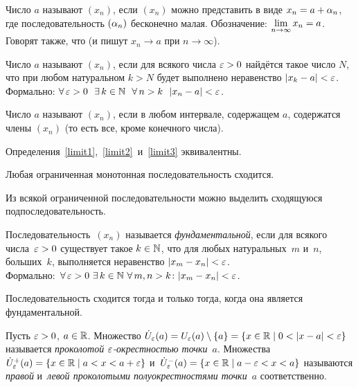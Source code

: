 \documentclass[a4paper,12pt]{article}
\newcommand{\sm}{\setminus}
\begin{document}

\renewcommand{\spacer}{\vspace{1mm}}

\label{limit1}
Число $a$ называют  $(x_n)$, если $(x_n)$ можно представить в виде $x_n = a + \alpha_n$, где последовательность $(\alpha_n)$ бесконечно малая.
Обозначение: $\lim\limits_{n \rightarrow \infty} x_n = a$.
Говорят также, что  (и пишут $x_n \to a$ при $n \to \infty$).

\label{limit2}
Число $a$ называют  $(x_n)$, если для всякого числа $\varepsilon > 0$ найдётся такое число $N$, что при любом натуральном $k > N$ будет выполнено неравенство $|x_k - a| < \varepsilon$.\\
Формально: $\forall\,\ep>0\ \ \exists\,k\in\N\ \ \forall\,n>k \ \ |x_n-a|<\ep$.

\label{limit3}
Число $a$ называют  $(x_n)$, если в любом интервале, содержащем $a$, содержатся  члены $(x_n)$ (то есть все, кроме конечного числа).

Определения~\ref{limit1},~\ref{limit2}~и~\ref{limit3} эквивалентны.

Любая ограниченная монотонная последовательность сходится.\hspace{-2mm}

Из всякой ограниченной последовательности можно выделить сходящуюся подпоследовательность.

Последовательность~$(x_n)$ называется \emph{фундаментальной}, если для всякого числа~$\varepsilon>0$ существует такое $k\in\mathbb{N}$, что для любых натуральных~$m$ и~$n$, больших~$k$, выполняется неравенство $|x_m - x_n|<\varepsilon$.\\
Формально: $\,\forall\,\varepsilon>0\,\,\exists\, k\in\mathbb{N}\,\,\forall\, m,n>k \colon |x_m-x_n|<\varepsilon$.

Последовательность сходится тогда и только тогда, когда она является фундаментальной.

Пусть $\varepsilon > 0$, $a \in \mathbb{R}$. Множество $\dot U_\ep(a) = U_\ep(a) \sm \{a\} = \{x \in \R \mid 0<|x-a|<\ep\}$ называется \emph{проколотой $\varepsilon$-окрестностью точки}~$a$. Множества $\dot U_\varepsilon^+(a) = \{x\in \mathbb{R} \mid a<x<a+\varepsilon\}$ и~$\dot U_\varepsilon^-(a)=\{x\in \mathbb{R} \mid a-\varepsilon<x<a\}$ называются \emph{правой} и~\emph{левой проколотыми полуокрестностями точки}~$a$ соответственно.
\end{document}
